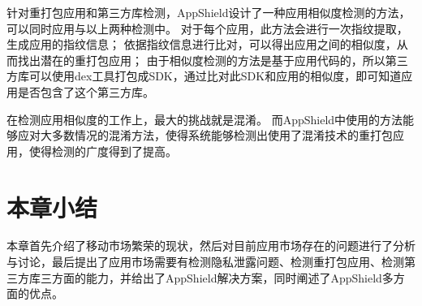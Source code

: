 针对重打包应用和第三方库检测，AppShield设计了一种应用相似度检测的方法，可以同时应用与以上两种检测中。
对于每个应用，此方法会进行一次指纹提取，生成应用的指纹信息；
依据指纹信息进行比对，可以得出应用之间的相似度，从而找出潜在的重打包应用；
由于相似度检测的方法是基于应用代码的，所以第三方库可以使用dex工具打包成SDK，通过比对此SDK和应用的相似度，即可知道应用是否包含了这个第三方库。

在检测应用相似度的工作上，最大的挑战就是混淆。
而AppShield中使用的方法能够应对大多数情况的混淆方法，使得系统能够检测出使用了混淆技术的重打包应用，使得检测的广度得到了提高。

\section{本章小结}
\label{sec:intro-conclusion}
本章首先介绍了移动市场繁荣的现状，然后对目前应用市场存在的问题进行了分析与讨论，最后提出了应用市场需要有检测隐私泄露问题、检测重打包应用、检测第三方库三方面的能力，并给出了AppShield解决方案，同时阐述了AppShield多方面的优点。